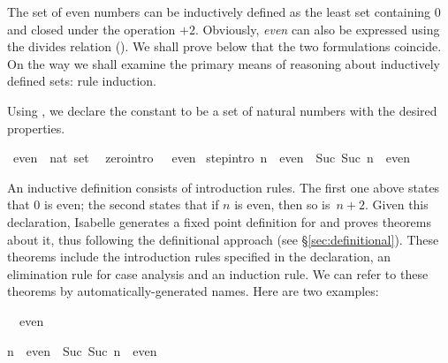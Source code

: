 %
\begin{isabellebody}%
\def\isabellecontext{Even}%
%
\isadelimtheory
%
\endisadelimtheory
%
\isatagtheory
%
\endisatagtheory
{\isafoldtheory}%
%
\isadelimtheory
%
\endisadelimtheory
%
\isamarkuptrue%
%
\begin{isamarkuptext}%
%
The set of even numbers can be inductively defined as the least set
containing 0 and closed under the operation $+2$.  Obviously,
\emph{even} can also be expressed using the divides relation (). 
We shall prove below that the two formulations coincide.  On the way we
shall examine the primary means of reasoning about inductively defined
sets: rule induction.%
\end{isamarkuptext}%
\isamarkuptrue%
%
\isamarkuptrue%
%
\begin{isamarkuptext}%
Using , we declare the constant  to be
a set of natural numbers with the desired properties.%
\end{isamarkuptext}%
\isamarkuptrue%
\isamarkupfalse%
\ even\ {\isacharcolon}{\isacharcolon}\ {\isachardoublequoteopen}nat\ set{\isachardoublequoteclose}\isanewline
{}\isanewline
\ \ zero{\isacharbrackleft}intro{\isacharbang}{\isacharbrackright}{\isacharcolon}\ {\isachardoublequoteopen}{}\ {\isasymin}\ even{\isachardoublequoteclose}\isanewline
{\isacharbar}\ step{\isacharbrackleft}intro{\isacharbang}{\isacharbrackright}{\isacharcolon}\ {\isachardoublequoteopen}n\ {\isasymin}\ even\ {\isasymLongrightarrow}\ {\isacharparenleft}Suc\ {\isacharparenleft}Suc\ n{\isacharparenright}{\isacharparenright}\ {\isasymin}\ even{\isachardoublequoteclose}%
\begin{isamarkuptext}%
An inductive definition consists of introduction rules.  The first one
above states that 0 is even; the second states that if $n$ is even, then so
is~$n+2$.  Given this declaration, Isabelle generates a fixed point
definition for  and proves theorems about it,
thus following the definitional approach (see {\S}\ref{sec:definitional}).
These theorems
include the introduction rules specified in the declaration, an elimination
rule for case analysis and an induction rule.  We can refer to these
theorems by automatically-generated names.  Here are two examples:
\begin{isabelle}%
{}\ {\isasymin}\ even\par\smallskip%
n\ {\isasymin}\ even\ {\isasymLongrightarrow}\ Suc\ {\isacharparenleft}Suc\ n{\isacharparenright}\ {\isasymin}\ even%
\end{isabelle}


\end{isamarkuptext}
\end{isabellebody}
